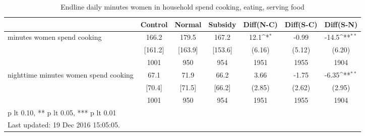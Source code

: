 \begin{table}[htbp]\centering
\def\sym#1{\ifmmode^{#1}\else\(^{#1}\)\fi}
\caption{Endline daily minutes women in household spend cooking, eating, serving food \label{tab:"balance"}}
\begin{tabular*}{1\hsize}{@{\hskip\tabcolsep\extracolsep\fill}l*{1}{cccccc}}
\toprule
                                &  Control&   Normal&  Subsidy&Diff(N-C)         &Diff(S-C)         &Diff(S-N)         \\
\midrule
minutes women spend cooking     &    166.2&    179.5&    167.2&     12.1\sym{*}  &    -0.99         &    -14.5\sym{**} \\
                                &  [161.2]&  [163.9]&  [153.6]&   (6.16)         &   (5.12)         &   (6.20)         \\
                                &     1001&      950&      954&     1951         &     1955         &     1904         \\
nighttime minutes women spend cooking&     67.1&     71.9&     66.2&     3.66         &    -1.75         &    -6.35\sym{**} \\
                                &   [70.4]&   [71.5]&   [66.2]&   (2.85)         &   (2.62)         &   (2.95)         \\
                                &     1001&      950&      954&     1951         &     1955         &     1904         \\
\bottomrule
\multicolumn{7}{l}{\footnotesize * p lt 0.10, ** p lt 0.05, *** p lt 0.01}\\
\multicolumn{7}{l}{\footnotesize Last updated: 19 Dec 2016 15:05:05.}\\
\end{tabular*}
\end{table}
